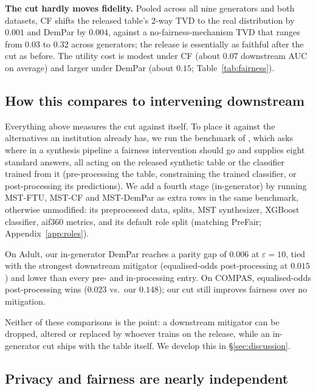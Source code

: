 \documentclass{article}
\begin{document}
\textbf{The cut hardly moves fidelity.} Pooled across all nine generators
and both datasets, CF shifts the released table's $2$-way TVD to the real
distribution by $0.001$ and DemPar by $0.004$, against a
no-fairness-mechanism TVD that ranges from $0.03$ to $0.32$ across
generators; the release is essentially as faithful after the cut as
before. The utility cost is modest under CF (about $0.07$ downstream AUC on
average) and larger under DemPar (about $0.15$; Table~\ref{tab:fairness}).

\subsection{How this compares to intervening downstream}
\label{sec:downstream}



Everything above measures the cut against itself. To place it against the
alternatives an institution already has, we run the benchmark of
\citet{angelozzi2026where}, which asks where in a synthesis pipeline a
fairness intervention should go and supplies eight standard answers, all
acting on the released synthetic table or the classifier trained from it
(pre-processing the table, constraining the trained classifier, or
post-processing its predictions). We add a fourth stage (in-generator)
by running MST-FTU, MST-CF and MST-DemPar as extra rows in the same
benchmark, otherwise unmodified: its preprocessed data, splits, MST
synthesizer, XGBoost classifier, aif360 metrics, and its default role split
(matching PreFair; Appendix~\ref{app:roles}).

On Adult, our in-generator DemPar reaches a parity gap of $0.006$ at
$\varepsilon{=}10$, tied with the strongest downstream mitigator
(equalised-odds post-processing at $0.015$) and lower than every pre- and
in-processing entry. On COMPAS, equalised-odds post-processing wins ($0.023$
vs.\ our $0.148$); our cut still improves fairness over no mitigation.

Neither of these comparisons is the point: a downstream mitigator can be
dropped, altered or replaced by whoever trains on the release, while an
in-generator cut ships with the table itself. We develop this in
\S\ref{sec:discussion}.

\subsection{Privacy and fairness are nearly independent}
\label{sec:privacy}
\end{document}
